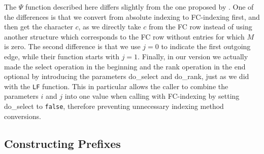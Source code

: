 \documentclass[a4paper,12pt,twoside,BCOR=10mm]{scrbook}
\begin{document}
The $ \Psi $ function described here differs slightly from the one proposed by \citet{Siren2014}. 
One of the differences is that we convert from absolute indexing to FC-indexing first, 
and then get the character $ c $, as we directly take $ c $ from the FC row instead 
of using another structure which corresponds to the FC row without entries for which $ M $ is zero. 
The second difference is that we use $ j \boldsymbol{=} 0 $ to indicate the first outgoing edge, 
while their function starts with $ j \boldsymbol{=} 1 $. 
Finally, in our version we actually made the select operation in the beginning and the rank operation in 
the end optional by introducing the parameters do\_select and do\_rank, 
just as we did with the \texttt{LF} function. 
This in particular allows the caller to combine the parameters $ i $ and $ j $ into one value 
when calling with FC-indexing by setting do\_select to \texttt{false}, 
therefore preventing unnecessary indexing method conversions.


\subsection{Constructing Prefixes}
\label{sec:gml_flat_construct_prefixes}
\end{document}
